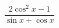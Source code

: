 \begin{ex}[type=expression]
	\begin{condition}
		\( \dfrac{2\cos^2 x-1}{\sin x+\cos x} \)
	\end{condition}
\end{ex}